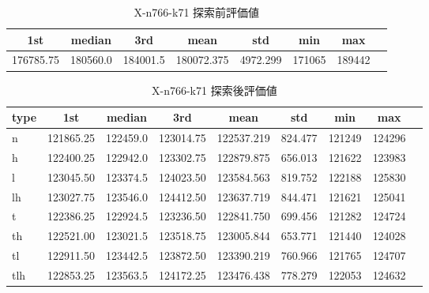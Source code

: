 \begin{table}[htbp]
    \centering
    \caption{X-n766-k71 探索前評価値}
    \begin{tabular}{|l|l|l|l|l|l|l|l|}\hline
    \multicolumn{1}{|c|}{\textbf{1st}}
    &\multicolumn{1}{c|}{\textbf{median}}
    &\multicolumn{1}{c|}{\textbf{3rd}}
    &\multicolumn{1}{c|}{\textbf{mean}}
    &\multicolumn{1}{c|}{\textbf{std}}
    &\multicolumn{1}{c|}{\textbf{min}}
    &\multicolumn{1}{c|}{\textbf{max}}\\\hline
	176785.75 & 180560.0 & 184001.5 & 180072.375 & 4972.299 & 171065 & 189442\\\hline
	\end{tabular}
\end{table}
\begin{table}[htbp]
    \centering
    \caption{X-n766-k71 探索後評価値}
    \begin{tabular}{|l|l|l|l|l|l|l|l|l|}\hline
    \multicolumn{1}{|c|}{\textbf{type}}
    &\multicolumn{1}{|c|}{\textbf{1st}}
    &\multicolumn{1}{c|}{\textbf{median}}
    &\multicolumn{1}{c|}{\textbf{3rd}}
    &\multicolumn{1}{c|}{\textbf{mean}}
    &\multicolumn{1}{c|}{\textbf{std}}
    &\multicolumn{1}{c|}{\textbf{min}}
    &\multicolumn{1}{c|}{\textbf{max}}\\\hline
	n & 121865.25 & 122459.0 & 123014.75 & 122537.219 & 824.477 & 121249 & 124296\\\hline
	h & 122400.25 & 122942.0 & 123302.75 & 122879.875 & 656.013 & 121622 & 123983\\\hline
	l & 123045.50 & 123374.5 & 124023.50 & 123584.563 & 819.752 & 122188 & 125830\\\hline
	lh & 123027.75 & 123546.0 & 124412.50 & 123637.719 & 844.471 & 121621 & 125041\\\hline
	t & 122386.25 & 122924.5 & 123236.50 & 122841.750 & 699.456 & 121282 & 124724\\\hline
	th & 122521.00 & 123021.5 & 123518.75 & 123005.844 & 653.771 & 121440 & 124028\\\hline
	tl & 122911.50 & 123442.5 & 123872.50 & 123390.219 & 760.966 & 121765 & 124707\\\hline
	tlh & 122853.25 & 123563.5 & 124172.25 & 123476.438 & 778.279 & 122053 & 124632\\\hline
	\end{tabular}
\end{table}

